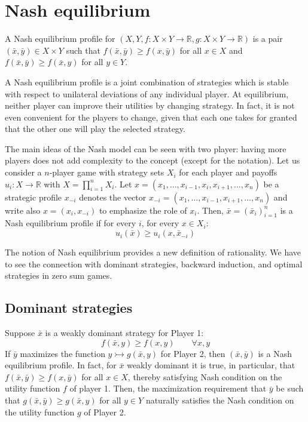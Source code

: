 \section{Nash equilibrium}

\begin{definition}
    A Nash equilibrium profile for $(X,Y,f:X\times Y\rightarrow\mathbb{R},g:X\times Y\rightarrow\mathbb{R})$ is a pair $(\bar{x},\bar{y})\in X \times Y$ such that $f(\bar{x},\bar{y})\geq f(x,\bar{y})$ for all $x\in X$ and $f(\bar{x},\bar{y})\geq f(\bar{x},y)$ for all $y\in Y$.
\end{definition}
\noindent A Nash equilibrium profile is a joint combination of strategies which is stable with respect to unilateral deviations of any individual player. 
At equilibrium, neither player can improve their utilities by changing strategy. 
In fact, it is not even convenient for the players to change, given that each one takes for granted that the other one will play the selected strategy. 

The main ideas of the Nash model can be seen with two player: having more players does not add complexity to the concept (except for the notation). 
Let us consider a  $n$-player game with strategy sets $X_i$ for each player and payoffs $u_i:X\rightarrow\mathbb{R}$ with $X=\prod_{i=1}^{n}X_i$. 
Let $x=(x_1,\dots,x_{i-1},x_i,x_{i+1},\dots,x_n)$ be a strategic profile $x_{-i}$ denotes the vector $x_{-i}=(x_1,\dots,x_{i-1},x_{i+1},\dots,x_n)$ and write also $x=(x_i,x_{-i})$ to emphasize the role of $x_i$. 
Then, $\bar{x}=(\bar{x}_i)_{i=1}^{n}$ is a Nash equilibrium profile if for every $i$, for every $x\in X_i$: 
\[u_i(\bar{x})\geq u_i(x,\bar{x}_{-i})\]

The notion of Nash equilibrium provides a new definition of rationality. 
We have to see the connection with dominant strategies, backward induction, and optimal strategies in zero sum games. 

\subsection{Dominant strategies}
Suppose $\bar{x}$ is a weakly dominant strategy for Player 1: 
\[f(\bar{x},y)\geq f(x,y)\qquad \forall x,y\]
\noindent If $\bar{y}$ maximizes the function $y\rightarrowtail g(\bar{x},y)$ for Player 2, then $(\bar{x},\bar{y})$ is a Nash equilibrium profile. 
In fact, for $\bar{x}$ weakly dominant it is true, in particular, that $f(\bar{x},\bar{y})\geq f(x,\bar{y})$ for all $x\in X$, thereby satisfying Nash condition on the utility function $f$ of player 1. 
Then, the maximization requirement that $\bar{y}$ be such that $g(\bar{x},\bar{y})\geq g(\bar{x},y)$ for all $y\in Y$ naturally satisfies the Nash condition on the utility function $g$ of Player 2. 

